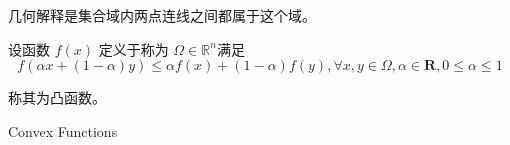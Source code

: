 几何解释是集合域内两点连线之间都属于这个域。

\begin{definition}[凸函数]
    设函数 $ f(x) $ 定义于称为 $ \Omega \in \mathbb{R}^{n} $满足
    $$ f(\alpha x+(1-\alpha) y) \leq \alpha f(x)+(1-\alpha) f(y), \forall x, y \in \Omega, \alpha \in \mathbf{R}, 0 \leq \alpha \leq 1 $$

    称其为凸函数。 
\end{definition}

\begin{FigureCenter}{Convex Functions}
    


\begin{tikzpicture}[x=0.75pt,y=0.75pt,yscale=-1,xscale=1]


\end{tikzpicture}
\end{FigureCenter}
